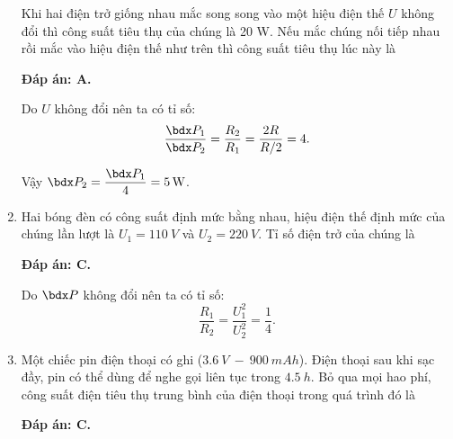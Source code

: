 \begin{enumerate}[label=\bfseries Câu \arabic*:]
	\cauhoi
	{Khi hai điện trở giống nhau mắc song song vào một hiệu điện thế $U$ không đổi thì công suất tiêu thụ của chúng là 20 W. Nếu mắc chúng nối tiếp nhau rồi mắc vào hiệu điện thế như trên thì công suất tiêu thụ lúc này là
		
	}
	\loigiai
	{	\textbf{Đáp án: A.}
		
		Do $U$ không đổi nên ta có tỉ số:
		$$\dfrac{\calP_1}{\calP_2} = \dfrac{R_2}{R_1} = \dfrac{2R}{R/2} = 4.$$
		
		Vậy $\calP_2 = \dfrac{\calP_1}{4} = \SI{5}{W}$.
	}
	\item {}
	
	\cauhoi
	{Hai bóng đèn có công suất định mức bằng nhau, hiệu điện thế định mức của chúng lần lượt là $U_1=\SI{110}{V}$ và $U_2=\SI{220}{V}$. Tỉ số điện trở của chúng là
		
	}
	\loigiai
	{	\textbf{Đáp án: C.}
		
		Do $\calP$ không đổi nên ta có tỉ số:
		$$\dfrac{R_1}{R_2} = \dfrac{U_1^2}{U_2^2} = \dfrac{1}{4}.$$
	}
	\item {}
	
	\cauhoi
	{Một chiếc pin điện thoại có ghi ($\SI{3.6}{V}\ -\ \SI{900}{mAh}$). Điện thoại sau khi sạc đầy, pin có thể dùng để nghe gọi liên tục trong $\SI{4.5}{h}$. Bỏ qua mọi hao phí, công suất điện tiêu thụ trung bình của điện thoại trong quá trình đó là
		
	}
	\loigiai
	{	\textbf{Đáp án: C.}
		
}
\end{enumerate}
